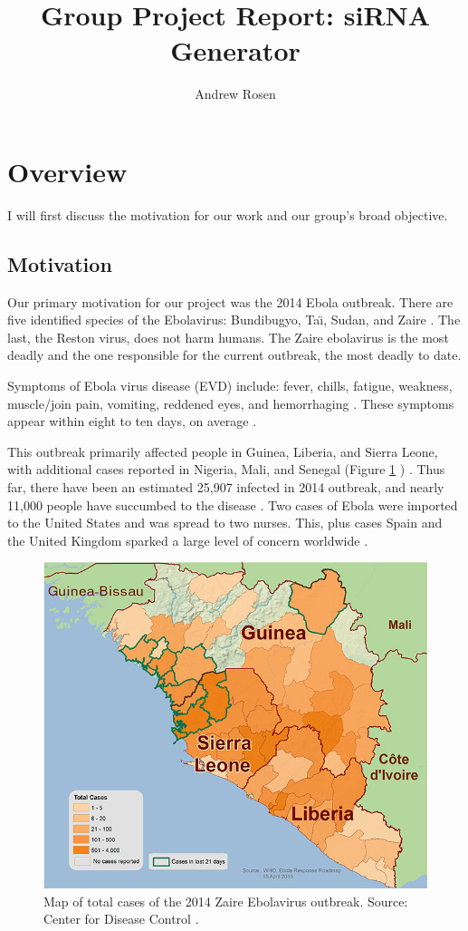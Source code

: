 \documentclass[10pt,letterpaper]{article}
\author{Andrew Rosen}
\title{Group Project Report: siRNA Generator}
\date{}
\begin{document}
\maketitle

\section{Overview}
I will first discuss the motivation for our work and our group's broad objective.


\subsection{Motivation}
Our primary motivation for our project was the 2014 Ebola outbreak.
There are five identified species of the Ebolavirus: Bundibugyo, Ta\"{\i}, Sudan, and Zaire \cite{centers20152014}.
The last, the Reston virus, does not harm humans.
The Zaire ebolavirus is the most deadly and the one responsible for the current outbreak, the most deadly to date.

Symptoms of Ebola virus disease (EVD) include: fever, chills, fatigue, weakness, muscle/join pain,  vomiting, reddened eyes, and hemorrhaging \cite{team2014ebola} \cite{wongcharacterization}.
These symptoms appear within eight to ten days, on average \cite{centers20152014}.


This outbreak primarily affected people in Guinea, Liberia, and Sierra Leone, with additional cases reported in Nigeria, Mali, and Senegal (Figure \ref{fig:west-africa-distribution-map} ) \cite{centers20152014}.
Thus far, there have been an estimated 25,907 infected in 2014 outbreak, and nearly 11,000 people have succumbed to the disease \cite{centers20152014}.
Two cases of Ebola were imported to the United States and was spread to two nurses. 
This, plus cases Spain and the United Kingdom sparked a large level of concern worldwide  \cite{levin2015ebola} \cite{ready}.

\begin{figure}
\centering
\includegraphics[width=0.5\linewidth]{west-africa-distribution-map}
\caption{Map of total cases of the 2014 Zaire Ebolavirus outbreak. Source: Center for Disease Control \cite{centers20152014}.}
\label{fig:west-africa-distribution-map}
\end{figure}
\end{document}
